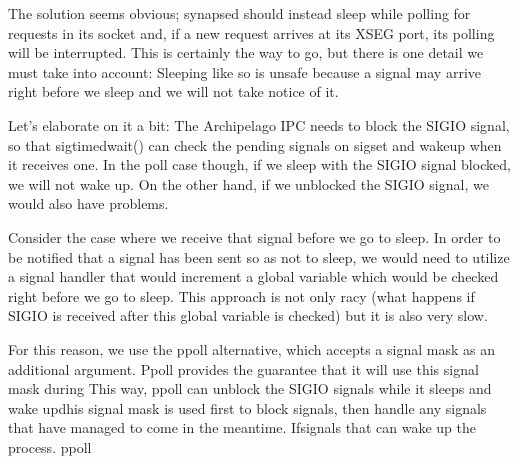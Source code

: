 The solution seems obvious; synapsed should instead sleep while polling for 
requests in its socket and, if a new request arrives at its XSEG port, its 
polling will be interrupted. This is certainly the way to go, but there is one
detail we must take into account: Sleeping like so is unsafe because a signal 
may arrive right before we sleep and we will not take notice of it.

Let's elaborate on it a bit: The Archipelago IPC needs to block the SIGIO 
signal, so that sigtimedwait() can check the pending signals on sigset and 
wakeup when it receives one. In the poll case though, if we sleep with the 
SIGIO signal blocked, we will not wake up. On the other hand, if we unblocked 
the SIGIO signal, we would also have problems.

Consider the case where we receive that signal before we go to sleep. In order 
to be notified that a signal has been sent so as not to sleep, we would need to 
utilize a signal handler that would increment a global variable which would be 
checked right before we go to sleep. This approach is not only racy (what 
happens if SIGIO is received after this global variable is checked) but it is 
also very slow.

For this reason, we use the ppoll alternative, which accepts a signal mask as 
an additional argument. Ppoll provides the guarantee that it will use this 
signal mask during This way, ppoll can unblock the SIGIO signals while it 
sleeps and wake updhis signal mask is used first to block signals, then handle 
any signals that have managed to come in the meantime.  Ifsignals that can wake 
up the process.  ppoll
